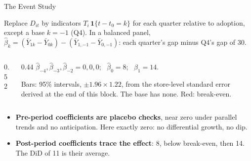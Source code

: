 \documentclass[aspectratio=169, 11pt, handout]{beamer}
\newcommand{\ind}[1]{\mathbf{1}\{#1\}}
\begin{document}
\begin{frame}{The Event Study}

Replace $D_{it}$ by indicators $T_i\,\ind{t - t_0 = k}$ for each quarter relative to adoption, except a base $k = -1$ (Q4). In a balanced panel, $\hat\beta_k = (\bar Y_{1k} - \bar Y_{0k}) - (\bar Y_{1,-1} - \bar Y_{0,-1})$: each quarter's gap minus Q4's gap of 30.

\begin{columns}[c]
\begin{column}{0.52\textwidth}
\end{column}
\begin{column}{0.44\textwidth}
\small
$\hat\beta_{-4}, \hat\beta_{-3}, \hat\beta_{-2} = 0, 0, 0$; \ $\hat\beta_0 = 8$; \ $\hat\beta_1 = 14$.

\smallskip
Bars: 95\% intervals, $\pm 1.96 \times 1.22$, from the store-level standard error derived at the end of this block. The base has none. Red: break-even.
\end{column}
\end{columns}

\smallskip

\begin{itemize}
  \item \textbf{Pre-period coefficients are placebo checks}, near zero under parallel trends and no anticipation. Here exactly zero: no differential growth, no dip.
  \item \textbf{Post-period coefficients trace the effect}: 8, below break-even, then 14. The DiD of 11 is their average.
\end{itemize}
\end{frame}
\end{document}
